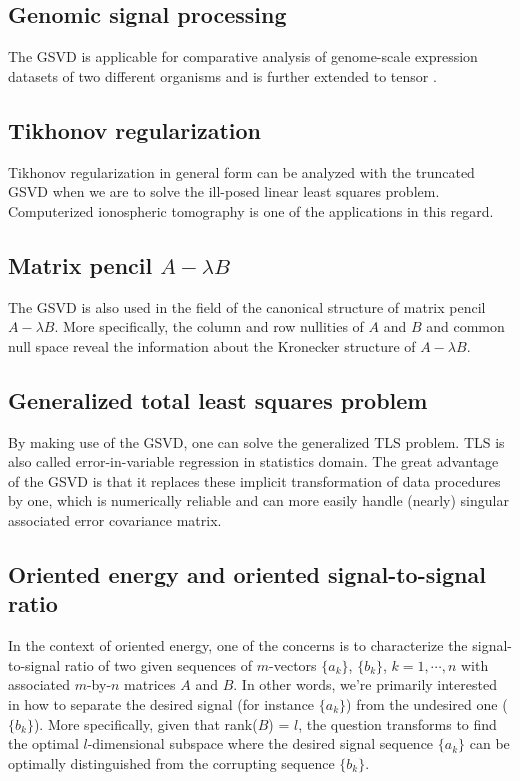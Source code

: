  

\subsection{Genomic signal processing}
The GSVD is applicable for comparative analysis of genome-scale expression datasets of two different organisms \cite{alter2003generalized} and is further extended to tensor \cite{sankaranarayanan2015tensor}.

\subsection{Tikhonov regularization}
Tikhonov regularization in general form can be analyzed with the truncated GSVD when we are to solve the ill-posed linear least squares problem. \cite{hansen1989regularization} \cite{dykes2014simplified} \cite{wei2016tikhonov} Computerized ionospheric tomography \cite{bhuyan2004application} is one of the applications in this regard. 

\subsection{Matrix pencil $A - \lambda B$}
The GSVD is also used in the field of the canonical structure of matrix pencil $A-\lambda B$. \cite{kaagstrom1984generalized} More specifically, the column and row nullities of $A$ and $B$ and common null space reveal the information about the Kronecker structure of $A-\lambda B$.

\subsection{Generalized total least squares problem}
By making use of the GSVD, one can solve the generalized TLS problem. TLS is also called error-in-variable regression in statistics domain. The great advantage of the GSVD is that it replaces these implicit transformation of data procedures by one, which is numerically reliable and can more easily handle (nearly) singular associated error covariance matrix. \cite{van1989analysis} \cite{bai1992csd}

\subsection{Oriented energy and oriented signal-to-signal ratio}
In the context of oriented energy, one of the concerns is to characterize the signal-to-signal ratio of two given sequences of $m$-vectors $\{a_k\}$, $\{b_k\}$, $k = 1,\cdots,n$ with associated $m$-by-$n$ matrices $A$ and $B$. \cite{de1988mathematical} In other words, we're primarily interested in how to separate the desired signal (for instance $\{a_k\}$) from the undesired one ($\{b_k\}$). More specifically, given that rank($B$) = $l$, the question transforms to find the optimal $l$-dimensional subspace where the desired signal sequence $\{a_k\}$ can be optimally distinguished from the corrupting sequence $\{b_k\}$.

